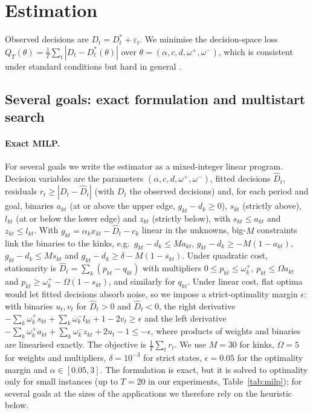 \documentclass[11pt,a4paper]{article}
\theoremstyle{remark}\newtheorem{remark}{Remark}
\begin{document}
\section{Estimation}\label{sec:alg}
Observed decisions are $D_t=D_t^*+\varepsilon_t$. We minimise the decision-space loss $Q_T(\theta)=\frac1T\sum_t|D_t-D^*_t(\theta)|$ over $\theta=(\alpha,c,d,\omega^+,\omega^-)$, which is consistent under standard conditions but hard in general \citep{aswani2018}.

\subsection{Several goals: exact formulation and multistart search}\label{sec:multi}
\paragraph{Exact MILP.} For several goals we write the estimator as a mixed-integer linear program. Decision variables are the parameters $(\alpha,c,d,\omega^+,\omega^-)$, fitted decisions $\hat D_t$, residuals $r_t\ge|D_t-\hat D_t|$ (with $D_t$ the observed decisions) and, for each period and goal, binaries $a_{kt}$ (at or above the upper edge, $g_{kt}-d_k\ge0$), $s_{kt}$ (strictly above), $l_{kt}$ (at or below the lower edge) and $z_{kt}$ (strictly below), with $s_{kt}\le a_{kt}$ and $z_{kt}\le l_{kt}$. With $g_{kt}=\alpha_kx_{kt}-\hat D_t-c_k$ linear in the unknowns, big-$M$ constraints link the binaries to the kinks, e.g.\ $g_{kt}-d_k\le Ma_{kt}$, $g_{kt}-d_k\ge-M(1-a_{kt})$, $g_{kt}-d_k\le Ms_{kt}$ and $g_{kt}-d_k\ge\delta-M(1-s_{kt})$. Under quadratic cost, stationarity is $\hat D_t=\sum_k(p_{kt}-q_{kt})$ with multipliers $0\le p_{kt}\le\omega_k^+$, $p_{kt}\le\Omega a_{kt}$ and $p_{kt}\ge\omega_k^+-\Omega(1-s_{kt})$, and similarly for $q_{kt}$. Under linear cost, flat optima would let fitted decisions absorb noise, so we impose a strict-optimality margin $\epsilon$: with binaries $u_t,v_t$ for $\hat D_t>0$ and $\hat D_t<0$, the right derivative $-\sum_k\omega_k^+s_{kt}+\sum_k\omega_k^-l_{kt}+1-2v_t\ge\epsilon$ and the left derivative $-\sum_k\omega_k^+a_{kt}+\sum_k\omega_k^-z_{kt}+2u_t-1\le-\epsilon$, where products of weights and binaries are linearised exactly. The objective is $\frac1T\sum_tr_t$. We use $M=30$ for kinks, $\Omega=5$ for weights and multipliers, $\delta=10^{-3}$ for strict states, $\epsilon=0.05$ for the optimality margin and $\alpha\in[0.05,3]$. The formulation is exact, but it is solved to optimality only for small instances (up to $T=20$ in our experiments, Table~\ref{tab:milp}); for several goals at the sizes of the applications we therefore rely on the heuristic below.
\end{document}
